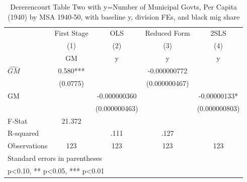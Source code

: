 \begin{table}[htbp]\centering
\def\sym#1{\ifmmode^{#1}\else\(^{#1}\)\fi}
\caption{Dererencourt Table Two with y=Number of Municipal Govts, Per Capita (1940) by MSA 1940-50, with baseline y, division FEs, and black mig share}
\begin{tabular}{l*{4}{c}}
\toprule
                    & First Stage   &         OLS   &Reduced Form   &        2SLS   \\
                    &\multicolumn{1}{c}{(1)}&\multicolumn{1}{c}{(2)}&\multicolumn{1}{c}{(3)}&\multicolumn{1}{c}{(4)}\\
                    &\multicolumn{1}{c}{GM}&\multicolumn{1}{c}{y}&\multicolumn{1}{c}{y}&\multicolumn{1}{c}{y}\\
\midrule
$\hat{GM}$          &       0.580***&               &-0.000000772   &               \\
                    &    (0.0775)   &               &(0.000000467)   &               \\
\addlinespace
GM                  &               &-0.000000360   &               & -0.00000133*  \\
                    &               &(0.000000463)   &               &(0.000000803)   \\
\midrule
F-Stat              &      21.372   &               &               &               \\
R-squared           &               &        .111   &        .127   &               \\
Observations        &         123   &         123   &         123   &         123   \\
\bottomrule
\multicolumn{5}{l}{\footnotesize Standard errors in parentheses}\\
\multicolumn{5}{l}{\footnotesize * p<0.10, ** p<0.05, *** p<0.01}\\
\end{tabular}
\end{table}
